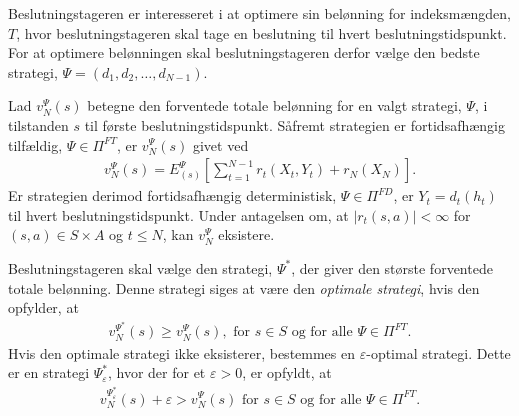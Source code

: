 

Beslutningstageren er interesseret i at optimere sin belønning for indeksmængden, $T$, hvor beslutningstageren skal tage en beslutning til hvert beslutningstidspunkt. For at optimere belønningen skal beslutningstageren derfor vælge den bedste strategi, $\Psi=(d_1, d_2,\dots, d_{N-1})$.

Lad $v_N^\Psi(s)$ betegne den forventede totale belønning for en valgt strategi, $\Psi$, i tilstanden $s$ til første beslutningstidspunkt. Såfremt strategien er fortidsafhængig tilfældig, $\Psi\in \Pi^{FT}$, er $v_N^\Psi(s)$ givet ved
\begin{align*}
    v_N^{\Psi}(s)=E_{(s)}^{\Psi}\left[\sum_{t=1}^{N-1}r_t(X_t, Y_t)+r_N(X_N)\right].
\end{align*}
Er strategien derimod fortidsafhængig deterministisk, $\Psi\in\Pi^{FD}$, er $Y_t = d_t(h_t)$ til hvert beslutningstidspunkt. Under antagelsen om, at $|r_t(s,a)| < \infty$ for $(s,a) \in S \times A$ og $t \leq N$, kan $v_N^\Psi$ eksistere. 




Beslutningstageren skal vælge den strategi, $\Psi^*$, der giver den største forventede totale belønning. Denne strategi siges at være den \textit{optimale strategi}, hvis den opfylder, at %
\begin{align*}
    v_N^{\Psi^*}(s)\geq v_N^{\Psi}(s), \text{ for } s\in S \text{ og for alle } \Psi\in \Pi^{FT}.
\end{align*}
Hvis den optimale strategi ikke eksisterer, bestemmes en $\varepsilon$-optimal strategi. Dette er en strategi $\Psi^*_\varepsilon$, hvor der for et $\varepsilon>0$, er opfyldt, at 
\begin{align*}
    v_N^{\Psi^*_\varepsilon}(s)+\varepsilon>v_N^\Psi(s) \text{ for } s\in S \text{ og for alle } \Psi \in \Pi^{FT}.
\end{align*}


